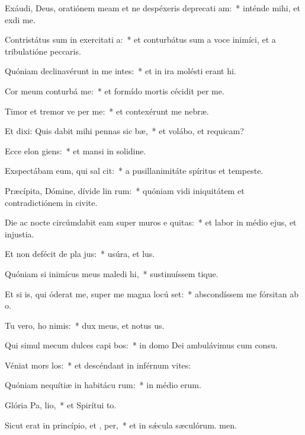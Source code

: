 \item Exáudi, Deus, oratiónem meam et ne despéxeris deprecati am:~* inténde mihi, et exdi me.
\item Contristátus sum in exercitati a:~* et conturbátus sum a voce inimíci, et a tribulatióne peccaris.
\item Quóniam declinavérunt in me intes:~* et in ira molésti erant hi.
\item Cor meum conturbá   me:~* et formído mortis cécidit per me.
\item Timor et tremor ve per me:~* et contexérunt me nebræ.
\item Et dixi: Quis dabit mihi pennas sic bæ,~* et volábo, et requicam?
\item Ecce elon giens:~* et mansi in solidine.
\item Exspectábam eum, qui sal  cit:~* a pusillanimitáte spíritus et tempeste.
\item Præcípita, Dómine, dívide lin rum:~* quóniam vidi iniquitátem et contradictiónem in civite.
\item Die ac nocte circúmdabit eam super muros e quitas:~* et labor in médio ejus, et injustia.
\item Et non defécit de pla jus:~* usúra, et lus.
\item Quóniam si inimícus meus maledi hi,~* sustinuíssem tique.
\item Et si is, qui óderat me, super me magna locú set:~* abscondíssem me fórsitan ab o.
\item Tu vero, ho nimis:~* dux meus, et notus us.
\item Qui simul mecum dulces capi bos:~* in domo Dei ambulávimus cum consu.
\item Véniat mors  los:~* et descéndant in inférnum vites:
\item Quóniam nequítiæ in habitácu rum:~* in médio erum.
\item Glória Pa,  lio,~* et Spirítui to.
\item Sicut erat in princípio, et ,  per,~* et in sǽcula sæculórum. men.
